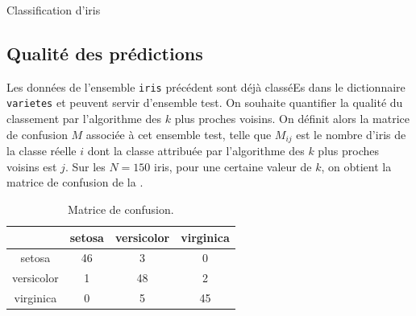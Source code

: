 \begin{exo}[PC][2][devoir]{Classification d'iris}
\subsection{Qualité des prédictions}
Les données de l'ensemble \texttt{iris} précédent sont déjà classéEs dans le dictionnaire \texttt{varietes} et peuvent servir d'ensemble test. On souhaite quantifier la qualité du classement par l'algorithme des $k$ plus proches voisins. On définit alors la matrice de confusion $M$ associée à cet ensemble test, telle que $M_{ij}$ est le nombre d'iris de la classe réelle $i$ dont la classe attribuée par l'algorithme des $k$ plus proches voisins est $j$. Sur les $N = 150$ iris, pour une certaine valeur de $k$, on obtient la matrice de confusion de la .
  \begin{table}[H]
    \centering
    \begin{tabular}{|c|c|c|c|}
      \hline
      & setosa & versicolor & virginica \\
      \hline
      setosa & 46 & 3 & 0 \\
      versicolor & 1 & 48 & 2 \\
      virginica & 0 & 5 & 45 \\
      \hline
    \end{tabular}
    \caption{Matrice de confusion.}
    \label{tab:confusion}
    

\end{table}
\end{exo}
